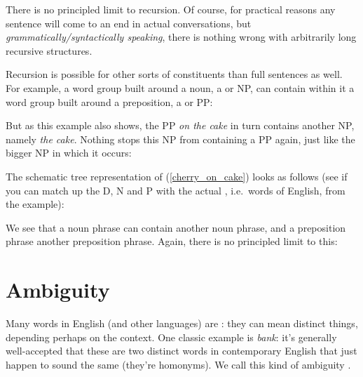 \documentclass{article}
\begin{document}
\begin{exe}
\end{exe}
There is no principled limit to recursion. Of course, for practical reasons any sentence will come to an end in actual conversations, but \emph{grammatically/syntactically speaking}, there is nothing wrong with arbitrarily long recursive structures.

Recursion is possible for other sorts of constituents than full sentences as well. 
For example, a word group built around a noun, a  or NP, can contain within it a word group built around a preposition, a  or PP:
\begin{exe}
\end{exe}
But as this example also shows, the PP \emph{on the cake} in turn contains another NP, namely \emph{the cake}.
Nothing stops this NP from containing a PP again, just like the bigger NP in which it occurs:
\begin{exe}
    \label{cherry_on_cake}
\end{exe}

The schematic tree representation of (\ref{cherry_on_cake}) looks as follows (see if you can match up the  D, N and P with the actual , i.e.~words of English, from the example):
\begin{exe}
\end{exe}
We see that a noun phrase can contain another noun phrase, and a preposition phrase another preposition phrase.
Again, there is no principled limit to this:
\begin{exe}
\end{exe}

\section{Ambiguity}
Many words in English (and other languages) are : they can mean distinct things, depending perhaps on the context. One classic example is \emph{bank}: it's generally well-accepted that these are two distinct words in contemporary English that just happen to sound the same (they're homonyms). We call this kind of ambiguity .
\end{document}
